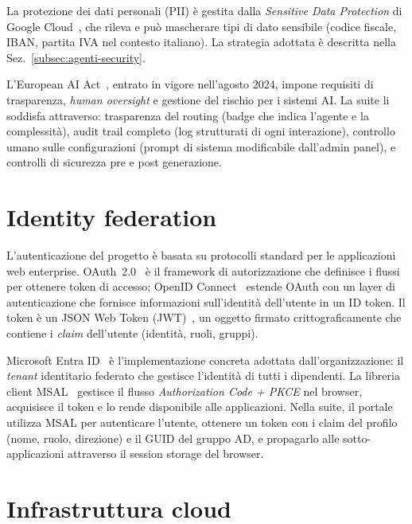 La protezione dei dati personali (PII) è gestita dalla \emph{Sensitive Data Protection} di Google Cloud~\cite{gcp_dlp}, 
che rileva e può mascherare tipi di dato sensibile (codice fiscale, IBAN, partita IVA nel contesto italiano). 
La strategia adottata è descritta nella Sez.~\ref{subsec:agenti-security}.

L'European AI Act~\cite{eu2024aiact}, entrato in vigore nell'agosto 2024, impone requisiti di trasparenza, \emph{human oversight} e gestione del rischio per i sistemi AI.
La suite li soddisfa attraverso: trasparenza del routing (badge che indica l'agente e la complessità), audit trail completo (log strutturati di ogni interazione), 
controllo umano sulle configurazioni (prompt di sistema modificabile dall'admin panel), e controlli di sicurezza pre e post generazione.

\section{Identity federation}
\label{sec:bg-identity}

L'autenticazione del progetto è basata su protocolli standard per le applicazioni web enterprise. 
OAuth~2.0~\cite{rfc6749oauth2} è il framework di autorizzazione che definisce i flussi per ottenere token di accesso; 
OpenID Connect~\cite{oidc1_0core} estende OAuth con un layer di autenticazione che fornisce informazioni 
sull'identità dell'utente in un ID token. Il token è un JSON Web Token (JWT)~\cite{rfc7519jwt}, 
un oggetto firmato crittograficamente che contiene i \emph{claim} dell'utente (identità, ruoli, gruppi).

Microsoft Entra ID~\cite{msft_entra_id} è l'implementazione concreta adottata dall'organizzazione: 
il \emph{tenant} identitario federato che gestisce l'identità di tutti i dipendenti. 
La libreria client MSAL~\cite{msft_msal} gestisce il flusso \emph{Authorization Code + PKCE} nel browser, 
acquisisce il token e lo rende disponibile alle applicazioni. 
Nella suite, il portale utilizza MSAL per autenticare l'utente, ottenere un token con i claim del profilo (nome, ruolo, direzione) 
e il GUID del gruppo AD, e propagarlo alle sotto-applicazioni attraverso il session storage del browser.

\section{Infrastruttura cloud}
\label{sec:bg-cloud}

